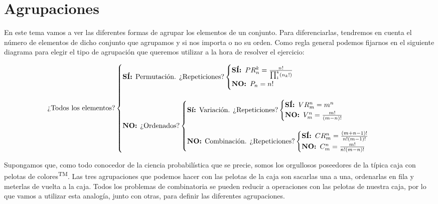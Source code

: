 \section{Agrupaciones}\label{agrupaciones}

En este tema vamos a ver las diferentes formas de agrupar los elementos de un conjunto.
Para diferenciarlas, tendremos en cuenta el número de elementos de dicho conjunto que agrupamos y si nos importa o no su orden.
Como regla general podemos fijarnos en el siguiente diagrama para elegir el tipo de agrupación que queremos utilizar a la hora de resolver el ejercicio:

\[
	\text{¿Todos los elementos?}
	\begin{cases}
		\text{\textbf{SÍ\@:} Permutación. ¿Repeticiones?}
		\begin{cases}
			\text{\textbf{SÍ\@: }} PR_{n}^{k} = \frac{n!}{\prod_{1}^{k}(n_k!)} \\
			\text{\textbf{NO\@: }} P_n = n! \\
		\end{cases}
		\\
		\\
		\text{\textbf{NO\@:} ¿Ordenados?}
		\begin{cases}
			\text{\textbf{Sí\@:} Variación. ¿Repeticiones?}
			\begin{cases}
				\text{\textbf{SÍ\@: }} VR_{m}^{n} = m^n \\
				\text{\textbf{NO\@: }} V_{m}^{n} = \frac{m!}{(m-n)!} \\
			\end{cases}
			\\
			\\
			\text{\textbf{NO\@:} Combinación. ¿Repeticiones?}
			\begin{cases}
				\text{\textbf{SÍ\@: }} CR_{m}^{n} = \frac{(m+n-1)!}{n!(m-1)!} \\
				\text{\textbf{NO\@: }} C_{m}^{n} = \frac{m!}{n!(m-n)!}
			\end{cases}
		\end{cases}
	\end{cases}
\]

Supongamos que, como todo conocedor de la ciencia probabilística que se precie, somos los orgullosos poseedores de la típica caja con pelotas de colores\textsuperscript{TM}.
Las tres agrupaciones que podemos hacer con las pelotas de la caja son sacarlas una a una, ordenarlas en fila y meterlas de vuelta a la caja.
Todos los problemas de combinatoria se pueden reducir a operaciones con las pelotas de nuestra caja, por lo que vamos a utilizar esta analogía, junto con otras, para definir las diferentes agrupaciones.

